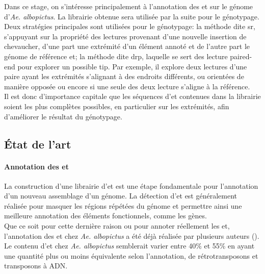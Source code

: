 \documentclass[10pt]{article}
\begin{document}
Dans ce stage, on s'intéresse principalement à l'annotation des \acrlong{et} sur le génome d'\textit{Ae. albopictus}. La librairie obtenue sera utilisée par la suite pour le génotypage. \\
Deux stratégies principales sont utilisées pour le génotypage: la méthode dite \acrfull{sr}, s'appuyant sur la propriété des lectures provenant d'une nouvelle insertion de chevaucher, d'une part une extrémité d'un élément annoté et de l'autre part le génome de référence et; la méthode dite \acrfull{drp}, laquelle se sert des lecture paired-end pour explorer un possible \acrfull{tip}. Par exemple, il explore deux lectures d'une paire ayant les extrémités s'alignant à des endroits différents, ou orientées de manière opposée ou encore si une seule des deux lecture s'aligne à la référence. \\
Il est donc d'importance capitale que les séquences d'\acrshort{et} contenues dans la librairie soient les plus complètes possibles, en particulier sur les extrémités, afin d'améliorer le résultat  du génotypage.

\newpage

\subsection{\'Etat de l'art}



\paragraph{Annotation des \acrshort{et}} La construction d'une librairie d'\acrlong{et} est une étape fondamentale pour l'annotation d'un nouveau assemblage d'un génome. La détection d'\acrshort{et} est généralement réalisée pour masquer les régions répétées du génome et permettre ainsi une meilleure annotation des éléments fonctionnels, comme les gènes. \\
Que ce soit pour cette dernière raison ou pour annoter réellement les \acrshort{et}, l'annotation des \acrshort{et} chez \textit{Ae. albopictus} a été déjà réalisée par plusieurs auteurs (\tableautorefname{ \ref{tab:annot_state_of_art}}). Le contenu d'\acrlong{et} chez \textit{Ae. albopictus} semblerait varier entre 40\% et 55\% en ayant une quantité plus ou moins équivalente selon l'annotation, de rétrotransposons et transposons à ADN.
\end{document}
